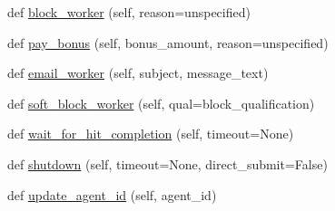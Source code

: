 \begin{DoxyCompactItemize}
\item 
def \hyperlink{classparlai_1_1mturk_1_1core_1_1dev_1_1agents_1_1MTurkAgent_a9c489d23ae16a931ef3945752e9fe359}{block\+\_\+worker} (self, reason=\textquotesingle{}unspecified\textquotesingle{})
\item 
def \hyperlink{classparlai_1_1mturk_1_1core_1_1dev_1_1agents_1_1MTurkAgent_a9171ff6eb3ff172868987fafba8f8efc}{pay\+\_\+bonus} (self, bonus\+\_\+amount, reason=\textquotesingle{}unspecified\textquotesingle{})
\item 
def \hyperlink{classparlai_1_1mturk_1_1core_1_1dev_1_1agents_1_1MTurkAgent_ae41f960fce1595f567e46aca27c654e5}{email\+\_\+worker} (self, subject, message\+\_\+text)
\item 
def \hyperlink{classparlai_1_1mturk_1_1core_1_1dev_1_1agents_1_1MTurkAgent_ad256094580f1dd63071a31cfe5c4ba98}{soft\+\_\+block\+\_\+worker} (self, qual=\textquotesingle{}block\+\_\+qualification\textquotesingle{})
\item 
def \hyperlink{classparlai_1_1mturk_1_1core_1_1dev_1_1agents_1_1MTurkAgent_a0e59979d8423f514f4c29dd169c21fda}{wait\+\_\+for\+\_\+hit\+\_\+completion} (self, timeout=None)
\item 
def \hyperlink{classparlai_1_1mturk_1_1core_1_1dev_1_1agents_1_1MTurkAgent_a2b0576f33db15042a1520f6c9b4157c2}{shutdown} (self, timeout=None, direct\+\_\+submit=False)
\item 
def \hyperlink{classparlai_1_1mturk_1_1core_1_1dev_1_1agents_1_1MTurkAgent_a77a8ec97a6c6662dd17cdd9f99d9fce6}{update\+\_\+agent\+\_\+id} (self, agent\+\_\+id)
\end{DoxyCompactItemize}

